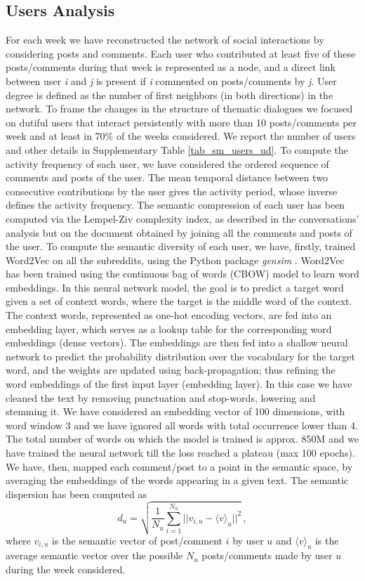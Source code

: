 \documentclass[fleqn,10pt]{wlscirep}
\begin{document}
\subsection*{Users Analysis}
%
For each week we have reconstructed the network of social interactions by considering posts and comments. Each user who contributed at least five of these posts/comments during that week is represented as a node, and a direct link between user \emph{i} and \emph{j} is present if \emph{i} commented on posts/comments by \emph{j}. 
User degree is defined as the number of first neighbors (in both directions) in the network.
%
To frame the changes in the structure of thematic dialogues we focused on dutiful users that interact persistently with more than 10 posts/comments per week and at least in 70\% of the weeks considered. We report the number of users and other details in Supplementary Table \ref{tab_sm_users_ud}.
%
To compute the activity frequency of each user, we have considered the ordered sequence of comments and posts of the user. The mean temporal distance between two consecutive contributions by the user gives the activity period, whose inverse defines the activity frequency.
%
The semantic compression of each user has been computed via the Lempel-Ziv complexity index, as described in the conversations' analysis but on the document obtained by joining all the comments and posts of the user.
%
To compute the semantic diversity of each user, we have, firstly, trained Word2Vec \cite{mikolov2013distributed} on all the subreddits, using the Python package \emph{gensim} \cite{rehurek2011gensim}. 
Word2Vec has been trained using the continuous bag of words (CBOW) model to learn word embeddings. In this neural network model, the goal is to predict a target word given a set of context words, where the target is the middle word of the context. The context words, represented as one-hot encoding vectors, are fed into an embedding layer, which serves as a lookup table for the corresponding word embeddings (dense vectors). The embeddings are then fed into a shallow neural network to predict the probability distribution over the vocabulary for the target word, and the weights are updated using back-propagation; thus refining the word embeddings of the first input layer (embedding layer).
In this case we have cleaned the text by removing punctuation and stop-words, lowering and stemming it. We have considered an embedding vector of 100 dimensions, with word window 3 and we have ignored all words with total occurrence lower than 4. The total number of words on which the model is trained is approx. 850M and we have trained the neural network till the loss reached a plateau (max 100 epochs).
We have, then, mapped each comment/post to a point in the semantic space, by averaging the embeddings of the words appearing in a given text. The semantic dispersion has been computed as
\begin{equation}
    d_u = \sqrt{\frac{1}{N_u}\sum_{i=1}^{N_u}||v_{i,u}-\langle v\rangle_{u}||^2}\,,
\end{equation}
where $v_{i,u}$ is the semantic vector of post/comment $i$ by user $u$ and $\langle v\rangle_u$ is the average semantic vector over the possible $N_u$ posts/comments made by user $u$ during the week considered.
\end{document}
